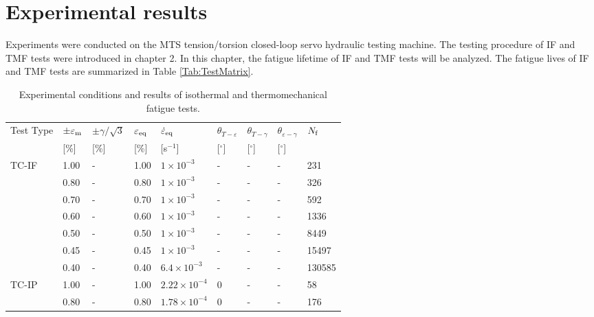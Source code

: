 \section{Experimental results}
\noindent
Experiments were conducted on the MTS tension/torsion closed-loop servo hydraulic testing machine. 
The testing procedure of IF and TMF tests were introduced in chapter 2. 
In this chapter, the fatigue lifetime of IF and TMF tests will be analyzed.
The fatigue lives of IF and TMF tests are summarized in Table \ref{Tab:TestMatrix}.

\begin{table*}[htbp]
  \centering
  \caption{Experimental conditions and results of isothermal and thermomechanical fatigue tests.} \vspace{0.1cm}
    \begin{tabular}{p{2cm}p{1.2cm}p{1.2cm}p{1.2cm}p{2.5cm}p{1cm}p{1cm}p{1cm}p{1cm}}
    \hline
    Test Type & $\pm \varepsilon _{\rm m}$ & $\pm \gamma/ \sqrt 3$ & $\varepsilon _{\rm eq}$ & $\dot \varepsilon _{\rm eq}$ & $\theta_{T-\varepsilon}$ & $\theta_{T-\gamma}$ & $\theta_{\varepsilon-\gamma}$ & $N_{\rm f}$ \\
          & [\%]  & [\%]  & [\%]  & [s$^{-1}$] & [$^\circ$] & [$^\circ$] & [$^\circ$] &  \\
    \hline
    TC-IF & 1.00  & -     & 1.00  & $1\times 10^{-3}$ & -     & -     & -     & 231 \\
          & 0.80  & -     & 0.80  & $1\times 10^{-3}$ & -     & -     & -     & 326 \\
          & 0.70  & -     & 0.70  & $1\times 10^{-3}$ & -     & -     & -     & 592 \\
          & 0.60  & -     & 0.60  & $1\times 10^{-3}$ & -     & -     & -     & 1336 \\
          & 0.50  & -     & 0.50  & $1\times 10^{-3}$ & -     & -     & -     & 8449 \\
          & 0.45  & -     & 0.45  & $1\times 10^{-3}$ & -     & -     & -     & 15497 \\
          & 0.40  & -     & 0.40  & $6.4\times 10^{-3}$ & -     & -     & -     & 130585 \\
    \hline
    TC-IP & 1.00  & -     & 1.00  & $2.22\times 10^{-4}$ & 0     & -     & -     & 58 \\
          & 0.80  & -     & 0.80  & $1.78\times 10^{-4}$ & 0     & -     & -     & 176 \\

\end{tabular}
\end{table*}
